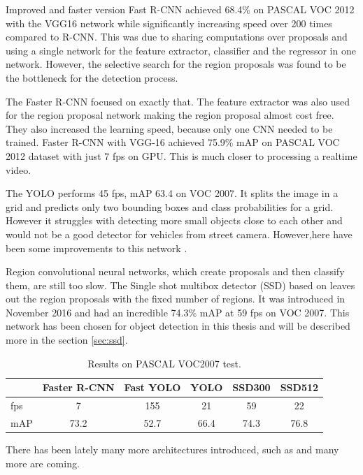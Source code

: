 \documentclass[a4paper,12pt,titlepage]{article}
\numberwithin{figure}{section}
\begin{document}
Improved and faster version Fast R-CNN \cite{girshick2015fast} achieved 68.4\% on PASCAL VOC 2012 with the VGG16 network while significantly increasing speed over 200 times compared to R-CNN. This was due to sharing computations over proposals and using a single network for the feature extractor, classifier and the regressor in one network. However, the selective search for the region proposals was found to be the bottleneck for the detection process.

The Faster R-CNN focused on exactly that. The feature extractor was also used for the region proposal network making the region proposal almost cost free. They also increased the learning speed, because only one CNN needed to be trained. Faster R-CNN with VGG-16 achieved 75.9\% mAP on PASCAL VOC 2012 dataset with just 7 fps on GPU. This is much closer to processing a realtime video.

The YOLO\cite{redmon2016you} performs 45 fps, mAP 63.4 on VOC 2007. It splits the image in a grid and predicts only two bounding boxes and class probabilities for a grid. However it struggles with detecting more small objects close to each other and would not be a good detector for vehicles from street camera. However,here have been some improvements to this network \cite{redmon2017yolo9000, redmon2018yolov3}.

Region convolutional neural networks, which create proposals and then classify them, are still too slow. The Single shot multibox detector (SSD) \cite{liu2016ssd} based on \cite{erhan2014scalable} leaves out the region proposals with the fixed number of regions. It was introduced in November 2016 and had an incredible 74.3\% mAP at 59 fps on VOC 2007. This network has been chosen for object detection in this thesis and will be described more in the section \ref{sec:ssd}. 

\begin{table}
\centering
\begin{tabular}{|l|c|c|c|c|c|}
  \hline
  &Faster R-CNN & Fast YOLO & YOLO & SSD300 & SSD512 \\
  \hline
  fps & 7 & 155 & 21 & 59 & 22\\
  \hline
  mAP & 73.2 & 52.7 & 66.4 & 74.3 & 76.8\\
  \hline
\end{tabular}
\caption{Results on PASCAL VOC2007 test.}
\end{table}

There has been lately many more architectures introduced, such as \cite{lin2017focal, li2017fssd, dai2016r} and many more are coming.
\end{document}
